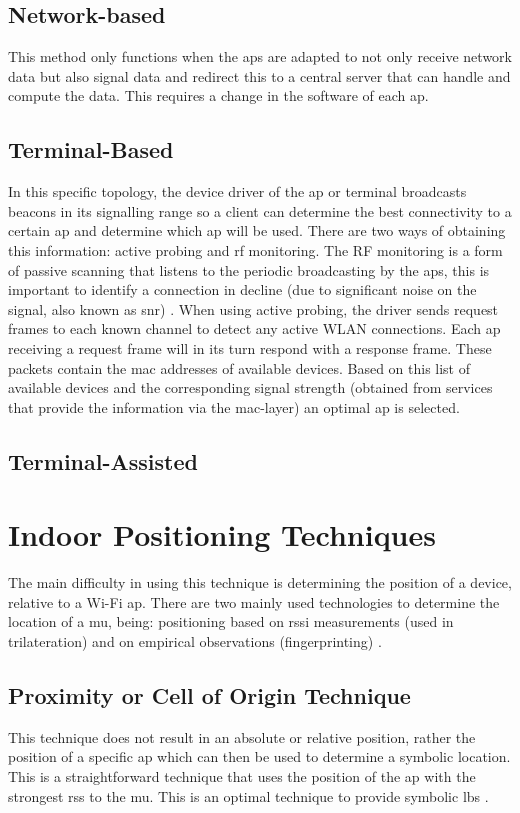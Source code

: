 \subsection{Network-based}
This method only functions when the \acrshort{ap}s are adapted to not only receive network data but also signal data and redirect this to a central server that can handle and compute the data. This requires a change in the software of each \acrlong{ap}.
\subsection{Terminal-Based}
In this specific topology, the device driver of the \acrshort{ap} or terminal broadcasts beacons in its signalling range so a client can determine the best connectivity to a certain \acrshort{ap} and determine which \acrshort{ap} will be used. There are two ways of obtaining this information: active probing and \acrshort{rf} monitoring. The RF monitoring is a form of passive scanning that listens to the periodic broadcasting by the \acrlong{ap}s, this is important to identify a connection in decline (due to significant noise on the signal, also known as \acrfull{snr}) . When using active probing, the driver sends request frames to each known channel to detect any active WLAN connections. Each \acrshort{ap} receiving a request frame will in its turn respond with a response frame. These packets contain the \acrshort{mac} addresses of available devices. Based on this list of available devices and the corresponding signal strength (obtained from services that provide the information via the \acrshort{mac}-layer) an optimal \acrshort{ap} is selected\cite[p.~8]{Retscher}.
\subsection{Terminal-Assisted}
\section{Indoor Positioning Techniques}
The main difficulty in using this technique is determining the position of a device, relative to a Wi-Fi \acrfull{ap}. There are two mainly used technologies to determine the location of a \acrfull{mu}, being: positioning based on \acrshort{rssi} measurements (used in trilateration) and on empirical observations (fingerprinting) \cite{Frank2009}.
\subsection{Proximity or Cell of Origin Technique}
This technique does not result in an absolute or relative position, rather the position of a specific \acrlong{ap} which can then be used to determine a symbolic location. This is a straightforward technique that uses the position of the \acrshort{ap} with the strongest \acrlong{rss} to the \acrlong{mu}. This is an optimal technique to provide symbolic \acrlong{lbs} \cite{Sakpere2017}.
